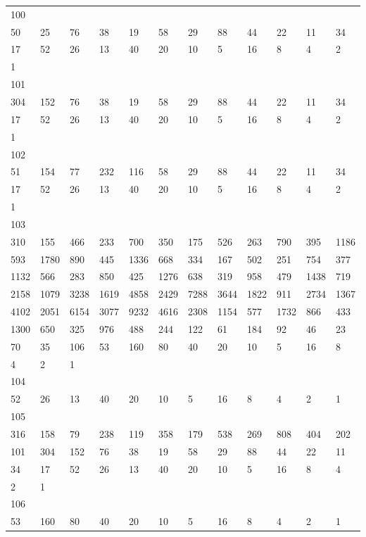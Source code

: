 \begin{longtable}{llllllllllll}
100&&&&&&&&&&&\\
50& 25& 76& 38& 19& 58& 29& 88& 44& 22& 11& 34\\
17& 52& 26& 13& 40& 20& 10& 5& 16& 8& 4& 2\\
1& \\

101&&&&&&&&&&&\\
304& 152& 76& 38& 19& 58& 29& 88& 44& 22& 11& 34\\
17& 52& 26& 13& 40& 20& 10& 5& 16& 8& 4& 2\\
1& \\

102&&&&&&&&&&&\\
51& 154& 77& 232& 116& 58& 29& 88& 44& 22& 11& 34\\
17& 52& 26& 13& 40& 20& 10& 5& 16& 8& 4& 2\\
1& \\

103&&&&&&&&&&&\\
310& 155& 466& 233& 700& 350& 175& 526& 263& 790& 395& 1186\\
593& 1780& 890& 445& 1336& 668& 334& 167& 502& 251& 754& 377\\
1132& 566& 283& 850& 425& 1276& 638& 319& 958& 479& 1438& 719\\
2158& 1079& 3238& 1619& 4858& 2429& 7288& 3644& 1822& 911& 2734& 1367\\
4102& 2051& 6154& 3077& 9232& 4616& 2308& 1154& 577& 1732& 866& 433\\
1300& 650& 325& 976& 488& 244& 122& 61& 184& 92& 46& 23\\
70& 35& 106& 53& 160& 80& 40& 20& 10& 5& 16& 8\\
4& 2& 1& \\

104&&&&&&&&&&&\\
52& 26& 13& 40& 20& 10& 5& 16& 8& 4& 2& 1\\

105&&&&&&&&&&&\\
316& 158& 79& 238& 119& 358& 179& 538& 269& 808& 404& 202\\
101& 304& 152& 76& 38& 19& 58& 29& 88& 44& 22& 11\\
34& 17& 52& 26& 13& 40& 20& 10& 5& 16& 8& 4\\
2& 1& \\

106&&&&&&&&&&&\\
53& 160& 80& 40& 20& 10& 5& 16& 8& 4& 2& 1\\


\end{longtable}
